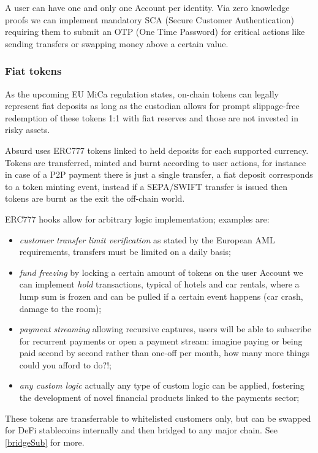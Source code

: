 \documentclass[a4paper,10 pt]{article}
\theoremstyle{definition}
\begin{document}
A user can have one and only one Account per identity. Via zero knowledge proofs we can implement mandatory SCA (Secure Customer Authentication) requiring them to submit an OTP (One Time Password) for critical actions like sending transfers or swapping money above a certain value.

\subsubsection{Fiat tokens}
As the upcoming EU MiCa regulation states, on-chain tokens can legally represent fiat deposits as long as the custodian allows for prompt slippage-free redemption of these tokens 1:1 with fiat reserves and those are not invested in risky assets.

Absurd uses ERC777 tokens linked to held deposits for each supported currency.
Tokens are transferred, minted and burnt according to user actions, for instance in case of a P2P payment there is just a single transfer, a fiat deposit corresponds to a token minting event, instead if a SEPA/SWIFT transfer is issued then tokens are burnt as the exit the off-chain world.

ERC777 hooks allow for arbitrary logic implementation; examples are:
\begin{itemize}
\item{\textit{customer transfer limit verification}} as stated by the European AML requirements, transfers must be limited on a daily basis;
\item{\textit{fund freezing}} by locking a certain amount of tokens on the user Account we can implement \textit{hold} transactions, typical of hotels and car rentals, where a lump sum is frozen and can be pulled if a certain event happens (car crash, damage to the room);
\item{\textit{payment streaming}} allowing recursive captures, users will be able to subscribe for recurrent payments or open a payment stream: imagine paying or being paid second by second rather than one-off per month, how many more things could you afford to do?!;
\item{\textit{any custom logic}} actually any type of custom logic can be applied, fostering the development of novel financial products linked to the payments sector;
\end{itemize}

These tokens are transferrable to whitelisted customers only, but can be swapped for DeFi stablecoins internally and then bridged to any major chain. See \ref{bridgeSub} for more.
\end{document}
